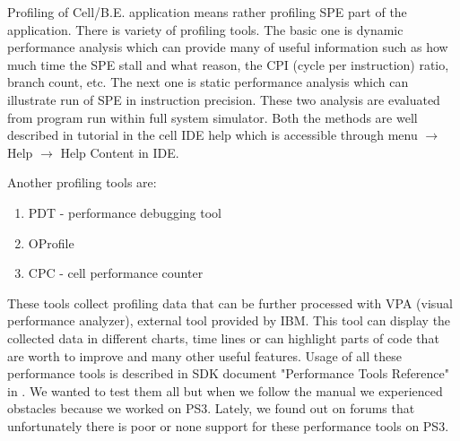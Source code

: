 \par
Profiling of Cell/B.E. application means rather profiling SPE part of the application.
There is variety of profiling tools.
The basic one is dynamic performance analysis which can provide many of useful information such as how much time the SPE stall and what reason, the CPI (cycle per instruction) ratio, branch count, etc.
The next one is static performance analysis which can illustrate run of SPE in instruction precision.
These two analysis are evaluated from program run within full system simulator.
Both the methods are well described in tutorial in the cell IDE help which is accessible through menu $\rightarrow$ Help $\rightarrow$ Help Content in IDE.

\par
Another profiling tools are:
\begin{enumerate}
\item{PDT - performance debugging tool}
\item{OProfile}
\item{CPC - cell performance counter}
\end{enumerate}

These tools collect profiling data that can be further processed with VPA (visual performance analyzer), external tool provided by IBM.
This tool can display the collected data in different charts, time lines or can highlight parts of code that are worth to improve and many other useful features.
Usage of all these performance tools is described in SDK document "Performance Tools Reference" in \cite{performanceToolRef}.
We wanted to test them all but when we follow the manual we experienced obstacles because we worked on PS3.
Lately, we found out on forums that unfortunately there is poor or none support for these performance tools on PS3.

